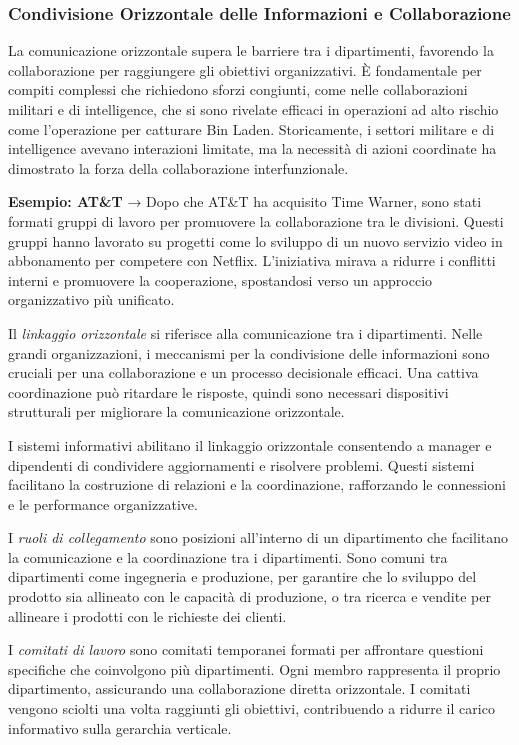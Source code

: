 \documentclass{article}
\begin{document}
\subsubsection{Condivisione Orizzontale delle Informazioni e Collaborazione}

La comunicazione orizzontale supera le barriere tra i dipartimenti, favorendo la collaborazione per raggiungere gli obiettivi organizzativi. È fondamentale per compiti complessi che richiedono sforzi congiunti, come nelle collaborazioni militari e di intelligence, che si sono rivelate efficaci in operazioni ad alto rischio come l'operazione per catturare Bin Laden. Storicamente, i settori militare e di intelligence avevano interazioni limitate, ma la necessità di azioni coordinate ha dimostrato la forza della collaborazione interfunzionale.

\textbf{Esempio: AT\&T} → Dopo che AT\&T ha acquisito Time Warner, sono stati formati gruppi di lavoro per promuovere la collaborazione tra le divisioni. Questi gruppi hanno lavorato su progetti come lo sviluppo di un nuovo servizio video in abbonamento per competere con Netflix. L'iniziativa mirava a ridurre i conflitti interni e promuovere la cooperazione, spostandosi verso un approccio organizzativo più unificato.



Il \textit{linkaggio orizzontale} si riferisce alla comunicazione tra i dipartimenti. Nelle grandi organizzazioni, i meccanismi per la condivisione delle informazioni sono cruciali per una collaborazione e un processo decisionale efficaci. Una cattiva coordinazione può ritardare le risposte, quindi sono necessari dispositivi strutturali per migliorare la comunicazione orizzontale.

I sistemi informativi abilitano il linkaggio orizzontale consentendo a manager e dipendenti di condividere aggiornamenti e risolvere problemi. Questi sistemi facilitano la costruzione di relazioni e la coordinazione, rafforzando le connessioni e le performance organizzative.


I \textit{ruoli di collegamento} sono posizioni all'interno di un dipartimento che facilitano la comunicazione e la coordinazione tra i dipartimenti. Sono comuni tra dipartimenti come ingegneria e produzione, per garantire che lo sviluppo del prodotto sia allineato con le capacità di produzione, o tra ricerca e vendite per allineare i prodotti con le richieste dei clienti.


I \textit{comitati di lavoro} sono comitati temporanei formati per affrontare questioni specifiche che coinvolgono più dipartimenti. Ogni membro rappresenta il proprio dipartimento, assicurando una collaborazione diretta orizzontale. I comitati vengono sciolti una volta raggiunti gli obiettivi, contribuendo a ridurre il carico informativo sulla gerarchia verticale.
\end{document}
